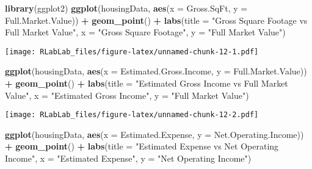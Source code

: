 \documentclass[
]{article}
\newenvironment{Shaded}{\begin{snugshade}}{\end{snugshade}}
\newcommand{\AttributeTok}[1]{\textcolor[rgb]{0.13,0.29,0.53}{#1}}
\newcommand{\FunctionTok}[1]{\textcolor[rgb]{0.13,0.29,0.53}{\textbf{#1}}}
\newcommand{\NormalTok}[1]{#1}
\newcommand{\SpecialCharTok}[1]{\textcolor[rgb]{0.81,0.36,0.00}{\textbf{#1}}}
\newcommand{\StringTok}[1]{\textcolor[rgb]{0.31,0.60,0.02}{#1}}
\begin{document}
\begin{Shaded}
\begin{Highlighting}[]
\FunctionTok{library}\NormalTok{(ggplot2)}
\FunctionTok{ggplot}\NormalTok{(housingData, }\FunctionTok{aes}\NormalTok{(}\AttributeTok{x =}\NormalTok{ Gross.SqFt, }\AttributeTok{y =}\NormalTok{ Full.Market.Value)) }\SpecialCharTok{+}
  \FunctionTok{geom\_point}\NormalTok{() }\SpecialCharTok{+}
  \FunctionTok{labs}\NormalTok{(}\AttributeTok{title =} \StringTok{"Gross Square Footage vs Full Market Value"}\NormalTok{,}
       \AttributeTok{x =} \StringTok{"Gross Square Footage"}\NormalTok{,}
       \AttributeTok{y =} \StringTok{"Full Market Value"}\NormalTok{)}
\end{Highlighting}
\end{Shaded}

\texttt{[image: RLabLab\_files/figure-latex/unnamed-chunk-12-1.pdf]}

\begin{Shaded}
\begin{Highlighting}[]
\FunctionTok{ggplot}\NormalTok{(housingData, }\FunctionTok{aes}\NormalTok{(}\AttributeTok{x =}\NormalTok{ Estimated.Gross.Income, }\AttributeTok{y =}\NormalTok{ Full.Market.Value)) }\SpecialCharTok{+}
  \FunctionTok{geom\_point}\NormalTok{() }\SpecialCharTok{+}
  \FunctionTok{labs}\NormalTok{(}\AttributeTok{title =} \StringTok{"Estimated Gross Income vs Full Market Value"}\NormalTok{,}
       \AttributeTok{x =} \StringTok{"Estimated Gross Income"}\NormalTok{,}
       \AttributeTok{y =} \StringTok{"Full Market Value"}\NormalTok{)}
\end{Highlighting}
\end{Shaded}

\texttt{[image: RLabLab\_files/figure-latex/unnamed-chunk-12-2.pdf]}

\begin{Shaded}
\begin{Highlighting}[]
\FunctionTok{ggplot}\NormalTok{(housingData, }\FunctionTok{aes}\NormalTok{(}\AttributeTok{x =}\NormalTok{ Estimated.Expense, }\AttributeTok{y =}\NormalTok{ Net.Operating.Income)) }\SpecialCharTok{+}
  \FunctionTok{geom\_point}\NormalTok{() }\SpecialCharTok{+}
  \FunctionTok{labs}\NormalTok{(}\AttributeTok{title =} \StringTok{"Estimated Expense vs Net Operating Income"}\NormalTok{,}
       \AttributeTok{x =} \StringTok{"Estimated Expense"}\NormalTok{,}
       \AttributeTok{y =} \StringTok{"Net Operating Income"}\NormalTok{)}
\end{Highlighting}
\end{Shaded}
\end{document}
